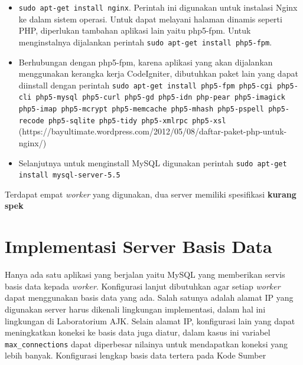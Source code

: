 \documentclass{ta-its}
\begin{document}
			\begin{itemize}
				\item \texttt{sudo apt-get install nginx}. Perintah ini digunakan untuk instalasi Nginx ke dalam sistem operasi. Untuk dapat melayani halaman dinamis seperti PHP, diperlukan tambahan aplikasi lain yaitu php5-fpm. Untuk menginstalnya dijalankan perintah \texttt{sudo apt-get install php5-fpm}. 
				\item Berhubungan dengan php5-fpm, karena aplikasi yang akan dijalankan menggunakan kerangka kerja CodeIgniter, dibutuhkan paket lain yang dapat diinstall dengan perintah \texttt{sudo apt-get install php5-fpm php5-cgi php5-cli php5-mysql php5-curl php5-gd php5-idn php-pear php5-imagick php5-imap php5-mcrypt php5-memcache php5-mhash php5-pspell php5-recode php5-sqlite php5-tidy php5-xmlrpc php5-xsl} (https://bayultimate.wordpress.com/2012/05/08/daftar-paket-php-untuk-nginx/)
				\item Selanjutnya untuk menginstall MySQL digunakan perintah \texttt{sudo apt-get install mysql-server-5.5}
			\end{itemize}
			
			
			Terdapat empat \textit{worker} yang digunakan, dua server memiliki spesifikasi \textbf{kurang spek}
		
		\section{Implementasi Server Basis Data}
			Hanya ada satu aplikasi yang berjalan yaitu MySQL yang memberikan servis basis data kepada \textit{worker}. Konfigurasi lanjut dibutuhkan agar setiap \textit{worker} dapat menggunakan basis data yang ada. Salah satunya adalah alamat IP yang digunakan server harus dikenali lingkungan implementasi, dalam hal ini lingkungan di Laboratorium AJK. Selain alamat IP, konfigurasi lain yang dapat meningkatkan koneksi ke basis data juga diatur, dalam kasus ini variabel \texttt{max\_connections} dapat diperbesar nilainya untuk mendapatkan koneksi yang lebih banyak. Konfigurasi lengkap basis data tertera pada Kode Sumber
		    
\end{document}

